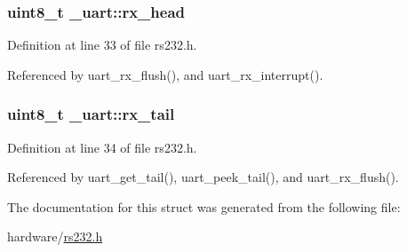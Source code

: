 \hypertarget{struct__uart_add14728bfbde14b7c260c8ff09bcd91b}{
\subsubsection[{rx\-\_\-head}]{\setlength{\rightskip}{0pt plus 5cm}uint8\-\_\-t \-\_\-uart\-::rx\-\_\-head}}\label{struct__uart_add14728bfbde14b7c260c8ff09bcd91b}


Definition at line 33 of file rs232.\-h.



Referenced by uart\-\_\-rx\-\_\-flush(), and uart\-\_\-rx\-\_\-interrupt().

\hypertarget{struct__uart_a4bd6a544526fe5ac94a5f9af09e3bbeb}{
\subsubsection[{rx\-\_\-tail}]{\setlength{\rightskip}{0pt plus 5cm}uint8\-\_\-t \-\_\-uart\-::rx\-\_\-tail}}\label{struct__uart_a4bd6a544526fe5ac94a5f9af09e3bbeb}


Definition at line 34 of file rs232.\-h.



Referenced by uart\-\_\-get\-\_\-tail(), uart\-\_\-peek\-\_\-tail(), and uart\-\_\-rx\-\_\-flush().



The documentation for this struct was generated from the following file\-:\begin{DoxyCompactItemize}
\item 
hardware/\hyperlink{rs232_8h}{rs232.\-h}\end{DoxyCompactItemize}
